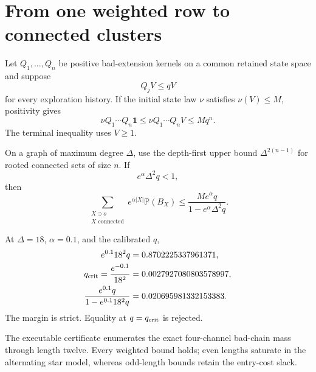 \section{From one weighted row to connected clusters}

Let \(Q_1,\ldots,Q_n\) be positive bad-extension kernels on a common retained
state space and suppose
\begin{equation}
 Q_jV\le qV
\end{equation}
for every exploration history.  If the initial state law \(\nu\) satisfies
\(\nu(V)\le M\), positivity gives
\begin{equation}
 \nu Q_1\cdots Q_n\mathbf 1
 \le \nu Q_1\cdots Q_nV
 \le Mq^n.
\end{equation}
The terminal inequality uses \(V\ge1\).

On a graph of maximum degree \(\Delta\), use the depth-first upper bound
\(\Delta^{2(n-1)}\) for rooted connected sets of size \(n\).  If
\begin{equation}
 e^\alpha\Delta^2q<1,
\end{equation}
then
\begin{equation}
 \sum_{\substack{X\ni o\\X\text{ connected}}}
 e^{\alpha|X|}\mathbb P(B_X)
 \le
 \frac{Me^\alpha q}{1-e^\alpha\Delta^2q}.
\end{equation}

At \(\Delta=18\), \(\alpha=0.1\), and the calibrated \(q\),
\begin{align}
 e^{0.1}18^2q&=0.8702225337961371,\\
 q_{\mathrm{crit}}=\frac{e^{-0.1}}{18^2}
 &=0.0027927080803578997,\\
 \frac{e^{0.1}q}{1-e^{0.1}18^2q}
 &=0.020695981332153383.
\end{align}
The margin is strict.  Equality at \(q=q_{\mathrm{crit}}\) is rejected.

The executable certificate enumerates the exact four-channel bad-chain mass
through length twelve.  Every weighted bound holds; even lengths saturate in
the alternating star model, whereas odd-length bounds retain the entry-cost
slack.
